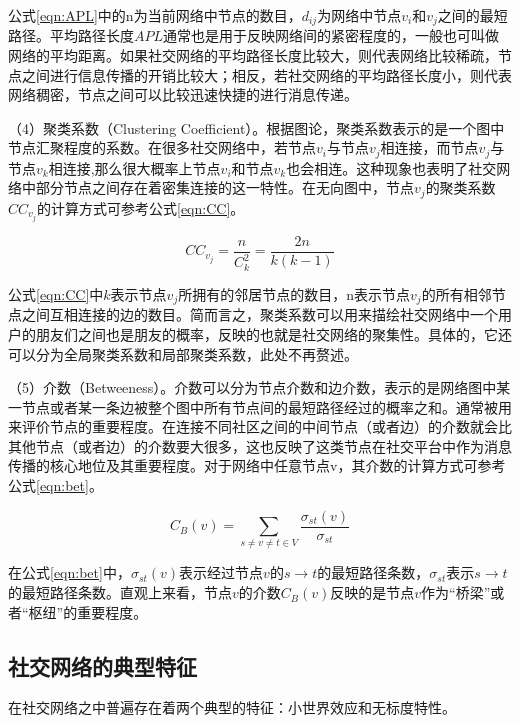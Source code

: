 公式\ref{eqn:APL}中的n为当前网络中节点的数目，$d_{ij}$为网络中节点$v_i$和$v_j$之间的最短路径。平均路径长度$APL$通常也是用于反映网络间的紧密程度的，一般也可叫做网络的平均距离。如果社交网络的平均路径长度比较大，则代表网络比较稀疏，节点之间进行信息传播的开销比较大；相反，若社交网络的平均路径长度小，则代表网络稠密，节点之间可以比较迅速快捷的进行消息传递。

（4）聚类系数（Clustering Coefficient）。根据图论，聚类系数表示的是一个图中节点汇聚程度的系数。在很多社交网络中，若节点$v_i$与节点$v_j$相连接，而节点$v_j$与节点$v_k$相连接,那么很大概率上节点$v_i$和节点$v_k$也会相连。这种现象也表明了社交网络中部分节点之间存在着密集连接的这一特性。在无向图中，节点$v_j$的聚类系数$CC_{v_j}$的计算方式可参考公式\ref{eqn:CC}。

\begin{equation}
  \label{eqn:CC}
  CC_{v_j}=\frac{n}{C_k^2}=\frac{2n}{k(k-1)}
\end{equation}

公式\ref{eqn:CC}中$k$表示节点$v_j$所拥有的邻居节点的数目，n表示节点$v_j$的所有相邻节点之间互相连接的边的数目。简而言之，聚类系数可以用来描绘社交网络中一个用户的朋友们之间也是朋友的概率，反映的也就是社交网络的聚集性。具体的，它还可以分为全局聚类系数和局部聚类系数，此处不再赘述。

（5）介数（Betweeness）。介数可以分为节点介数和边介数，表示的是网络图中某一节点或者某一条边被整个图中所有节点间的最短路径经过的概率之和。通常被用来评价节点的重要程度。在连接不同社区之间的中间节点（或者边）的介数就会比其他节点（或者边）的介数要大很多，这也反映了这类节点在社交平台中作为消息传播的核心地位及其重要程度。对于网络中任意节点v，其介数的计算方式可参考公式\ref{eqn:bet}。

\begin{equation}
  \label{eqn:bet}
  C_B(v)=\sum _{s\neq v\neq t \in V}\frac{\sigma_{st}(v)}{\sigma_{st}}
\end{equation}

在公式\ref{eqn:bet}中，$\sigma_{st}(v)$表示经过节点$v$的$s\rightarrow t$的最短路径条数，$\sigma_{st}$表示$s\rightarrow t$的最短路径条数。直观上来看，节点$v$的介数$C_B(v)$反映的是节点$v$作为“桥梁”或者“枢纽”的重要程度。

\subsection{社交网络的典型特征}
在社交网络之中普遍存在着两个典型的特征：小世界效应和无标度特性。

